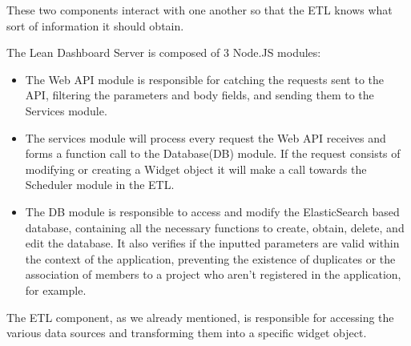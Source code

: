 \documentclass[a4paper,twoside,10pt]{report}
\begin{document}
These two components interact with one another so that the ETL knows what sort of information it should obtain.

The Lean Dashboard Server is composed of 3 Node.JS\cite{NODE} modules:
\begin{itemize}
 \item The Web API module is responsible for catching the requests sent to the API, filtering the parameters and body fields, and sending them to the Services module.
 \item The services module will process every request the Web API receives and forms a function call to the Database(DB) module. If the request consists of modifying or creating a Widget object it will make a call towards the Scheduler module in the ETL.
 \item The DB module is responsible to access and modify the ElasticSearch based database, containing all the necessary functions to create, obtain, delete, and edit the database. It also verifies if the inputted parameters are valid within the context of the application, preventing the existence of duplicates or the association of members to a project who aren't registered in the application, for example.
\end{itemize}
\newpage
The ETL component, as we already mentioned, is responsible for accessing the various data sources and transforming them into a specific widget object.
\end{document}
